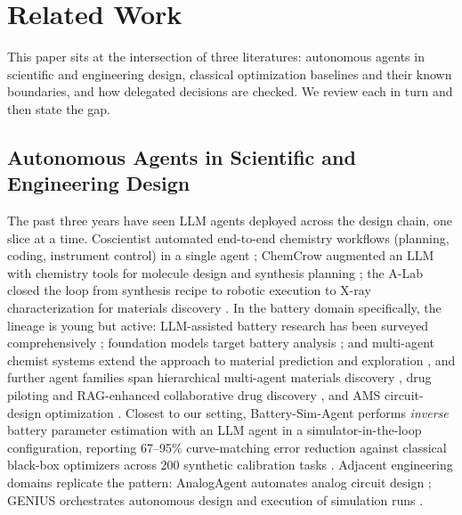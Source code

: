 \section{Related Work}
\label{sec:lit}

This paper sits at the intersection of three literatures: autonomous agents
in scientific and engineering design, classical optimization baselines and
their known boundaries, and how delegated decisions are checked. We
review each in turn and then state the gap.

\subsection{Autonomous Agents in Scientific and Engineering Design}

The past three years have seen LLM agents deployed across the design chain,
one slice at a time. Coscientist automated end-to-end chemistry workflows
 (planning, coding, instrument control) in a single agent
\cite{boiko2023coscientist}; ChemCrow augmented an LLM with chemistry tools
for molecule design and synthesis planning \cite{bran2024chemcrow}; the A-Lab
closed the loop from synthesis recipe to robotic execution to X-ray
characterization for materials discovery \cite{szymanski2023alab}. In the
battery domain specifically, the lineage is young but active: LLM-assisted
battery research has been surveyed comprehensively
\cite{batteryLLMreview2025}; foundation models target battery analysis
\cite{lipm2025}; and multi-agent chemist systems extend the approach to
material prediction and exploration \cite{chatmat2026, matsciagent2025,
matclaw2026}, and further agent families span hierarchical multi-agent
materials discovery \cite{rothfarb2025hierarchical}, drug piloting and
RAG-enhanced collaborative drug discovery \cite{drugpilot2025, cladd2025},
and AMS circuit-design optimization \cite{heart2025}. Closest to our
setting, Battery-Sim-Agent performs
\emph{inverse} battery parameter estimation with an LLM agent in a
simulator-in-the-loop configuration, reporting 67--95\% curve-matching error
reduction against classical black-box optimizers across 200 synthetic
calibration tasks \cite{chen2026battery}. Adjacent engineering domains
replicate the pattern: AnalogAgent automates analog circuit design
\cite{analogagent2026}; GENIUS orchestrates autonomous design and execution
of simulation runs \cite{genius2025}.

